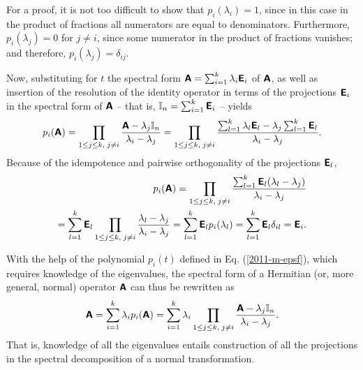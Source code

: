 {\color{OliveGreen}\bproof

For a proof, it is not too difficult
to show that
$p_i  (\lambda_i)=1$, since in this case in the product of fractions all numerators are equal to denominators.
Furthermore,
$p_i  (\lambda_j)=0$ for $j\neq i $, since some numerator in the product of fractions vanishes; and
therefore,
$p_i  (\lambda_j)=\delta_{ij}$.

Now, substituting for $t$ the spectral form $\textsf{\textbf{A}}=\sum_{i=1}^k \lambda_i\textsf{\textbf{E}}_i$
of $\textsf{\textbf{A}}$, as well as insertion of the
resolution of the identity operator in terms of the projections $\textsf{\textbf{E}}_i$ in the spectral form of
$\textsf{\textbf{A}}$ -- that is, ${\Bbb I}_n=\sum_{i=1}^k \textsf{\textbf{E}}_i$ --
yields
\begin{equation}
p_i  (\textsf{\textbf{A}})
=
\prod_{
1\le j\le k,\;
j\neq i
}\frac{\textsf{\textbf{A}} - \lambda_j{\Bbb I}_n}{\lambda_i -\lambda_j}
=
\prod_{
1\le j\le k,\;
j\neq i
}\frac{\sum_{l=1}^k \lambda_l\textsf{\textbf{E}}_l - \lambda_j\sum_{l=1}^k \textsf{\textbf{E}}_l}{\lambda_i -\lambda_j}
.
\end{equation}
Because of the idempotence and pairwise orthogonality of the projections  $\textsf{\textbf{E}}_l$,
\begin{equation}
\begin{split}
p_i  (\textsf{\textbf{A}}) =
\prod_{
1\le j\le k,\;
j\neq i
}\frac{\sum_{l=1}^k \textsf{\textbf{E}}_l(\lambda_l- \lambda_j)}{\lambda_i -\lambda_j}   \\
= \sum_{l=1}^k \textsf{\textbf{E}}_l
\prod_{
1\le j\le k,\;
j\neq i
}\frac{\lambda_l- \lambda_j}{\lambda_i -\lambda_j}
= \sum_{l=1}^k \textsf{\textbf{E}}_l
p_i  (\lambda_l)
= \sum_{l=1}^k \textsf{\textbf{E}}_l
\delta_{il} = \textsf{\textbf{E}}_i.
\label{2012-m-ch-fdvs-cc}
\end{split}
\end{equation}
\eproof
}

With the help of the polynomial $p_i(t)$ defined in Eq. (\ref{2011-m-epsf}),
which requires knowledge of the eigenvalues,
the spectral form of a Hermitian (or, more general, normal) operator  $\textsf{\textbf{A}}$ can thus be rewritten as
\begin{equation}
\textsf{\textbf{A}}=\sum_{i=1}^k \lambda_i p_i(\textsf{\textbf{A}})=  \sum_{i=1}^k \lambda_i \prod_{
1\le j\le k,\;
j\neq i
}\frac{\textsf{\textbf{A}} - \lambda_j{\Bbb I}_n}{\lambda_i -\lambda_j}.
\end{equation}
That is, knowledge of all the eigenvalues entails construction
of all the projections in the spectral decomposition
of a normal transformation.


